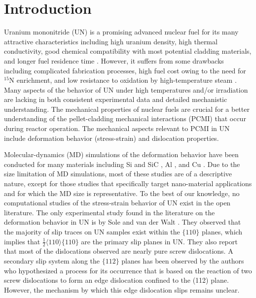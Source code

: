 \documentclass[applsci,article,submit,pdftex,moreauthors]{Definitions/mdpi}
\newcommand{\?}{\stackrel{?}{=}}
\begin{document}
\section{Introduction}

Uranium mononitride (UN) is a promising advanced nuclear fuel for its many attractive characteristics including high uranium density, high thermal conductivity, good chemical compatibility with most potential cladding materials, and longer fuel residence time \cite{Ekberg2018, Wallenius2020, Uno2020}. However, it suffers from some drawbacks including complicated fabrication processes, high fuel cost owing to the need for $^{15}$N enrichment, and low resistance to oxidation by high-temperature steam \cite{Ekberg2018, Wallenius2020, Uno2020}. Many aspects of the behavior of UN under high temperatures and/or irradiation are lacking in both consistent experimental data and detailed mechanistic understanding. The mechanical properties of nuclear fuels are crucial for a better understanding of the pellet-cladding mechanical interactions (PCMI) that occur during reactor operation. The mechanical aspects relevant to PCMI in UN include deformation behavior (stress-strain) and dislocation properties.


Molecular-dynamics (MD) simulations of the deformation behavior have been conducted for many materials including Si and SiC \cite{Ivashchenko2007}, Al \cite{Li2020}, and Cu \cite{Hansson2022}. Due to the size limitation of MD simulations, most of these studies are of a descriptive nature, except for those studies that specifically target nano-material applications and for which the MD size is representative. To the best of our knowledge, no computational studies of the stress-strain behavior of UN exist in the open literature. The only experimental study found in the literature on the deformation behavior in UN is by Sole and van der Walt \cite{Sole1968}. They observed that the majority of slip traces on UN samples exist within the $\{110\}$ planes, which implies that $\frac{1}{2} \langle 110 \rangle \{110\}$ are the primary slip planes in UN. They also report that most of the dislocations observed are nearly pure screw dislocations. A secondary slip system along the $\{112\}$ planes has been observed by the authors who hypothesized a process for its occurrence that is based on the reaction of two screw dislocations to form an edge dislocation confined to the (112) plane. However, the mechanism by which this edge dislocation slips remains unclear.
\end{document}
